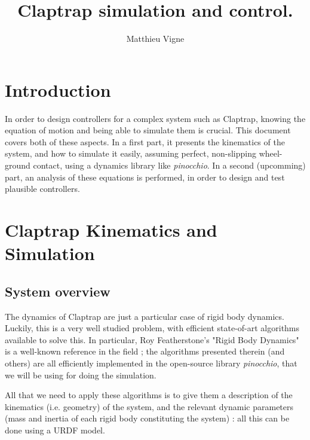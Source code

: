 \documentclass[a4paper,11pt]{article}
\title{Claptrap simulation and control.}
\author{Matthieu Vigne}
\begin{document}
\maketitle
\tableofcontents

\section{Introduction}

In order to design controllers for a complex system such as Claptrap, knowing the equation of motion and being able to simulate them is crucial. This document covers both of these aspects. In a first part, it presents the kinematics of the system, and how to simulate it easily, assuming perfect, non-slipping wheel-ground contact, using a dynamics library like \emph{pinocchio}. In a second (upcomming) part, an analysis of these equations is performed, in order to design and test plausible controllers.

\section{Claptrap Kinematics and Simulation}

\subsection{System overview}

The dynamics of Claptrap are just a particular case of rigid body dynamics. Luckily, this is a very well studied problem, with efficient state-of-art algorithms available to solve this. In particular, Roy Featherstone's "Rigid Body Dynamics" is a well-known reference in the field ; the algorithms presented therein (and others) are all efficiently implemented in the open-source library \emph{pinocchio}, that we will be using for doing the simulation.

All that we need to apply these algorithms is to give them a description of the kinematics (i.e. geometry) of the system, and the relevant dynamic parameters (mass and inertia of each rigid body constituting the system) : all this can be done using a URDF model.
\end{document}
